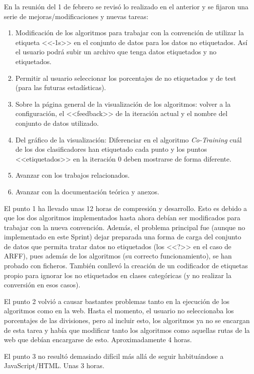 En la reunión del 1 de febrero se revisó lo realizado en el anterior y se fijaron
una serie de mejoras/modificaciones y nuevas tareas:
\begin{enumerate}
    \item Modificación de los algoritmos para trabajar con la convención de
    utilizar la etiqueta <<-1s>> en el conjunto de datos para los datos no
    etiquetados. Así el usuario podrá subir un archivo que tenga datos
    etiquetados y no etiquetados.
    \item Permitir al usuario seleccionar los porcentajes de no etiquetados y de
    test (para las futuras estadísticas).
    \item Sobre la página general de la visualización de los algoritmos: volver
    a la configuración, el <<feedback>> de la iteración actual y el nombre del
    conjunto de datos utilizado.
    \item Del gráfico de la visualización: Diferenciar en el algoritmo
    \textit{Co-Training} cuál de los dos clasificadores han etiquetado cada
    punto y los puntos <<etiquetados>> en la iteración 0 deben mostrarse de
    forma diferente.
    \item Avanzar con los trabajos relacionados.
    \item Avanzar con la documentación teórica y anexos.
\end{enumerate}

El punto 1 ha llevado unas 12 horas de compresión y desarrollo. Esto es debido a
que los dos algoritmos implementados hasta ahora debían ser modificados para
trabajar con la nueva convención. Además, el problema principal fue (aunque no
implementado en este Sprint) dejar preparada una forma de carga del conjunto de
datos que permita tratar datos no etiquetados (los <<?>> en el caso de ARFF),
pues además de los algoritmos (su correcto funcionamiento), se han probado con
ficheros. También conllevó la creación de un codificador de etiquetas propio
para ignorar los no etiquetados en clases categóricas (y no realizar la
conversión en esos casos).

El punto 2 volvió a causar bastantes problemas tanto en la ejecución de los
algoritmos como en la web. Hasta el momento, el usuario no seleccionaba los
porcentajes de las divisiones, pero al incluir esto, los algoritmos ya no se
encargan de esta tarea y había que modificar tanto los algoritmos como aquellas
rutas de la web que debían encargarse de esto. Aproximadamente 4 horas.

El punto 3 no resultó demasiado difícil más allá de seguir habituándose a
JavaScript/HTML. Unas 3 horas.

